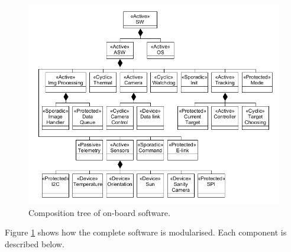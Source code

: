 \begin{figure}[H]
	\centering
	\includegraphics[width=\textwidth]{4-experiment-design/img/software/composition-tree.png}
	\caption{Composition tree of on-board software.}
	\label{fig:software-composition-tree}
\end{figure}

Figure \ref{fig:software-composition-tree} shows how the complete software is modularised. Each component is described below.

